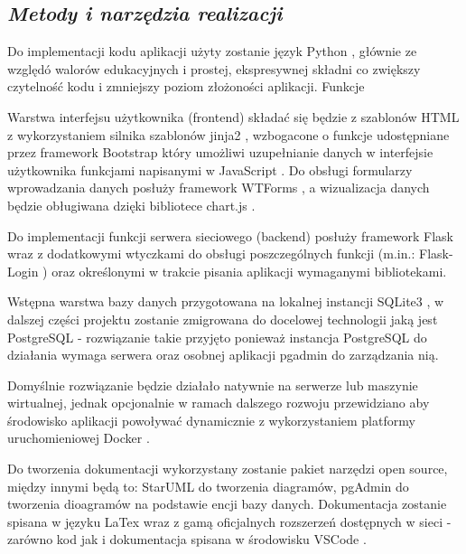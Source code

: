 \documentclass[a4paper,10pt, twoside]{report}
\newcommand{\customstylesection}[1]{\textbf{\textit{#1}}}
\begin{document}
\begin{large}
\section{\customstylesection{Metody i narzędzia realizacji}}
{Do implementacji kodu aplikacji użyty zostanie język Python \cite{Python}, 
głównie ze względó walorów edukacyjnych i prostej, ekspresywnej składni co 
zwiększy czytelność kodu i zmniejszy poziom złożoności aplikacji. Funkcje }

{Warstwa interfejsu użytkownika (frontend) składać się będzie z szablonów HTML z
 wykorzystaniem silnika szablonów jinja2 \cite{jinja}, wzbogacone o funkcje 
udostępniane przez framework Bootstrap \cite{Bootstrap} który umożliwi 
uzupełnianie danych w interfejsie użytkownika funkcjami napisanymi w 
JavaScript \cite{JavaScript}. Do obsługi formularzy wprowadzania danych posłuży 
framework WTForms \cite{WTForms}, a wizualizacja danych będzie obługiwana dzięki
 bibliotece chart.js \cite{chart.js}.}

{Do implementacji funkcji serwera sieciowego (backend) posłuży framework
 Flask \cite{Flask} wraz z dodatkowymi wtyczkami do obsługi poszczególnych 
funkcji (m.in.: Flask-Login \cite{Flask-Login}) oraz określonymi w trakcie 
pisania aplikacji wymaganymi bibliotekami.}

{Wstępna warstwa bazy danych przygotowana na lokalnej instancji 
SQLite3 \cite{SQLite}, w dalszej części projektu zostanie zmigrowana do 
docelowej technologii jaką jest PostgreSQL \cite{PostgreSQL} - rozwiązanie takie
 przyjęto ponieważ instancja PostgreSQL do działania wymaga serwera oraz osobnej
 aplikacji pgadmin \cite{pgAdmin} do zarządzania nią.}

{Domyślnie rozwiązanie będzie działało natywnie na serwerze lub maszynie 
wirtualnej, jednak opcjonalnie w ramach dalszego rozwoju przewidziano aby 
środowisko aplikacji powoływać dynamicznie z wykorzystaniem platformy 
uruchomieniowej Docker \cite{Docker}.}

{Do tworzenia dokumentacji wykorzystany zostanie pakiet narzędzi open source, 
między innymi będą to: StarUML \cite{StarUML} do tworzenia diagramów, pgAdmin 
\cite{pgAdmin} do tworzenia dioagramów na podstawie encji bazy danych. 
Dokumentacja zostanie spisana w języku LaTex \cite{LaTeX} wraz z gamą 
oficjalnych rozszerzeń dostępnych w sieci - zarówno kod jak i dokumentacja 
spisana w środowisku VSCode \cite{VSCode}.}


\end{large}
\end{document}
